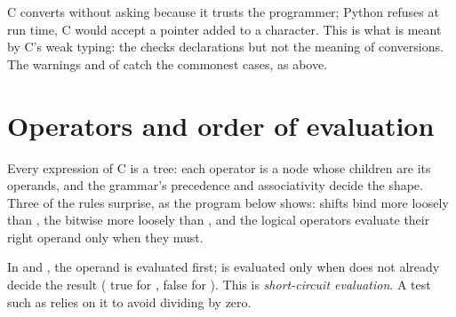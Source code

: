 C converts without asking because it trusts the programmer; Python refuses  at run time, C would
accept a pointer added to a character. This is what is meant by C's weak typing: the  checks declarations
but not the meaning of conversions. The warnings  and  of  catch the commonest cases, as above.

\section{Operators and order of evaluation}\label{sec:b1:c-types-and-control:operators}

Every expression of C is a tree: each operator is a node whose children are its operands, and the grammar's
precedence and associativity decide the shape. Three of the rules surprise, as the program below shows: shifts
bind more loosely than \code{+}, the bitwise \code{&} more loosely than \code{==}, and the logical operators
evaluate their right operand only when they must.

\label{lst:b1:c-types-and-control:precedence}

\label{out:b1:c-types-and-control:precedence}

\begin{definition}\label{def:b1:c-types-and-control:short-circuit}
In  and , the operand  is evaluated first;  is evaluated only when 
does not already decide the result ( true for \code{&&}, false for \code{||}). This is
\emph{short-circuit evaluation}. A test such as  relies
on it to avoid dividing by zero.
\end{definition}

\begin{omfigure}
\par{}
\end{omfigure}

